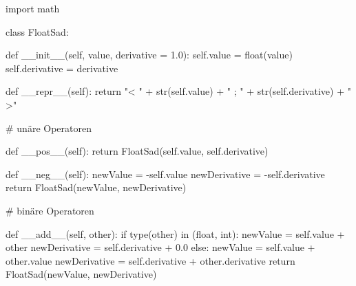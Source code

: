 \documentclass[
  a4paper,
  DIV=11]{scrreprt}
\newenvironment{Shaded}{\begin{snugshade}}{\end{snugshade}}
\newcommand{\BuiltInTok}[1]{\textcolor[rgb]{0.00,0.23,0.31}{#1}}
\newcommand{\CommentTok}[1]{\textcolor[rgb]{0.37,0.37,0.37}{#1}}
\newcommand{\ControlFlowTok}[1]{\textcolor[rgb]{0.00,0.23,0.31}{#1}}
\newcommand{\FloatTok}[1]{\textcolor[rgb]{0.68,0.00,0.00}{#1}}
\newcommand{\FunctionTok}[1]{\textcolor[rgb]{0.28,0.35,0.67}{#1}}
\newcommand{\ImportTok}[1]{\textcolor[rgb]{0.00,0.46,0.62}{#1}}
\newcommand{\KeywordTok}[1]{\textcolor[rgb]{0.00,0.23,0.31}{#1}}
\newcommand{\NormalTok}[1]{\textcolor[rgb]{0.00,0.23,0.31}{#1}}
\newcommand{\OperatorTok}[1]{\textcolor[rgb]{0.37,0.37,0.37}{#1}}
\newcommand{\StringTok}[1]{\textcolor[rgb]{0.13,0.47,0.30}{#1}}
\newcommand{\VariableTok}[1]{\textcolor[rgb]{0.07,0.07,0.07}{#1}}
\theoremstyle{definition}
\theoremstyle{definition}
\theoremstyle{remark}
\begin{document}
\begin{Shaded}
\begin{Highlighting}[]
\ImportTok{import}\NormalTok{ math}

\KeywordTok{class}\NormalTok{ FloatSad:}

    \KeywordTok{def} \FunctionTok{\_\_init\_\_}\NormalTok{(}\VariableTok{self}\NormalTok{, value, derivative }\OperatorTok{=} \FloatTok{1.0}\NormalTok{):}
        \VariableTok{self}\NormalTok{.value }\OperatorTok{=} \BuiltInTok{float}\NormalTok{(value)}
        \VariableTok{self}\NormalTok{.derivative }\OperatorTok{=}\NormalTok{ derivative}

    \KeywordTok{def} \FunctionTok{\_\_repr\_\_}\NormalTok{(}\VariableTok{self}\NormalTok{):}
        \ControlFlowTok{return} \StringTok{"\textless{} "} \OperatorTok{+} \BuiltInTok{str}\NormalTok{(}\VariableTok{self}\NormalTok{.value) }\OperatorTok{+} \StringTok{" ; "} \OperatorTok{+} \BuiltInTok{str}\NormalTok{(}\VariableTok{self}\NormalTok{.derivative) }\OperatorTok{+} \StringTok{" \textgreater{}"}


    \CommentTok{\# unäre Operatoren}

    \KeywordTok{def} \FunctionTok{\_\_pos\_\_}\NormalTok{(}\VariableTok{self}\NormalTok{):}
        \ControlFlowTok{return}\NormalTok{ FloatSad(}\VariableTok{self}\NormalTok{.value, }\VariableTok{self}\NormalTok{.derivative)}
    
    \KeywordTok{def} \FunctionTok{\_\_neg\_\_}\NormalTok{(}\VariableTok{self}\NormalTok{):}
\NormalTok{        newValue }\OperatorTok{=} \OperatorTok{{-}}\VariableTok{self}\NormalTok{.value}
\NormalTok{        newDerivative }\OperatorTok{=} \OperatorTok{{-}}\VariableTok{self}\NormalTok{.derivative}
        \ControlFlowTok{return}\NormalTok{ FloatSad(newValue, newDerivative)}
    

    \CommentTok{\# binäre Operatoren}

    \KeywordTok{def} \FunctionTok{\_\_add\_\_}\NormalTok{(}\VariableTok{self}\NormalTok{, other):}
        \ControlFlowTok{if} \BuiltInTok{type}\NormalTok{(other) }\KeywordTok{in}\NormalTok{ (}\BuiltInTok{float}\NormalTok{, }\BuiltInTok{int}\NormalTok{):}
\NormalTok{            newValue }\OperatorTok{=} \VariableTok{self}\NormalTok{.value }\OperatorTok{+}\NormalTok{ other}
\NormalTok{            newDerivative }\OperatorTok{=} \VariableTok{self}\NormalTok{.derivative }\OperatorTok{+} \FloatTok{0.0}
        \ControlFlowTok{else}\NormalTok{:}
\NormalTok{            newValue }\OperatorTok{=} \VariableTok{self}\NormalTok{.value }\OperatorTok{+}\NormalTok{ other.value}
\NormalTok{            newDerivative }\OperatorTok{=} \VariableTok{self}\NormalTok{.derivative }\OperatorTok{+}\NormalTok{ other.derivative}
        \ControlFlowTok{return}\NormalTok{ FloatSad(newValue, newDerivative)}


\end{Highlighting}
\end{Shaded}
\end{document}
